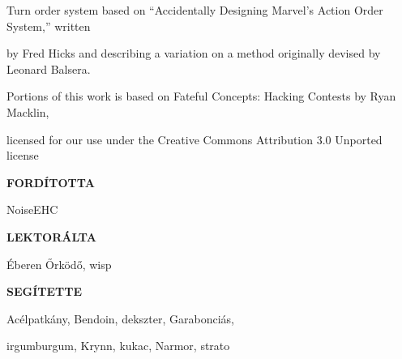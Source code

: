 \begin{center}
Turn order system based on “Accidentally Designing Marvel’s Action Order System,” written

by Fred Hicks and describing a variation on a method originally devised by Leonard Balsera.

Portions of this work is based on Fateful Concepts: Hacking Contests by Ryan Macklin,

licensed for our use under the Creative Commons Attribution 3.0 Unported license

\vspace{2em}

\textbf{FORDÍTOTTA}

NoiseEHC

\textbf{LEKTORÁLTA}

Éberen Őrködő, wisp

\textbf{SEGÍTETTE}

Acélpatkány, Bendoin, dekszter, Garabonciás,

irgumburgum, Krynn, kukac, Narmor, strato
\end{center}
